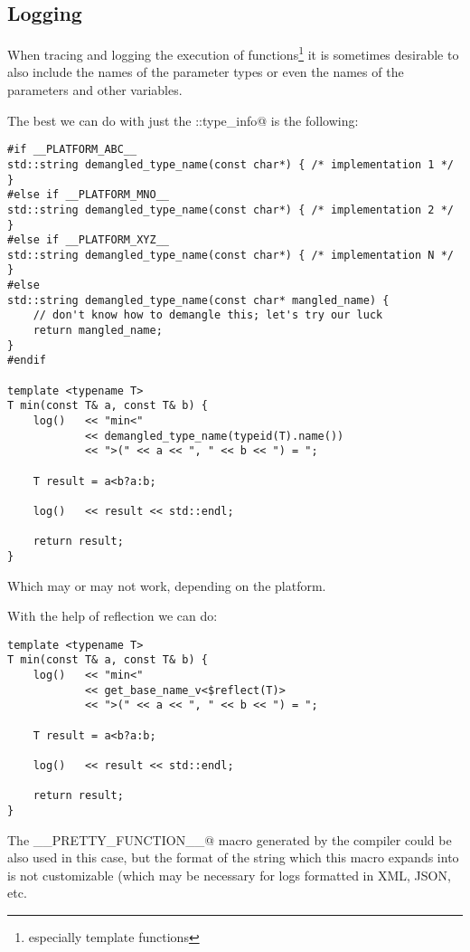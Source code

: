 \subsection{Logging}

When tracing and logging the execution of functions\footnote{especially template
functions} it is sometimes desirable to also include the names of the parameter
types or even the names of the parameters and other variables.

The best we can do with just the \verb@std::type_info@ is the following:

\begin{verbatim}
#if __PLATFORM_ABC__
std::string demangled_type_name(const char*) { /* implementation 1 */ }
#else if __PLATFORM_MNO__
std::string demangled_type_name(const char*) { /* implementation 2 */ }
#else if __PLATFORM_XYZ__
std::string demangled_type_name(const char*) { /* implementation N */ }
#else
std::string demangled_type_name(const char* mangled_name) {
	// don't know how to demangle this; let's try our luck
	return mangled_name;
}
#endif

template <typename T>
T min(const T& a, const T& b) {
	log()   << "min<"
	        << demangled_type_name(typeid(T).name())
	        << ">(" << a << ", " << b << ") = ";

	T result = a<b?a:b;

	log()   << result << std::endl;

	return result;
}

\end{verbatim}

Which may or may not work, depending on the platform.

With the help of reflection we can do:

\begin{verbatim}
template <typename T>
T min(const T& a, const T& b) {
	log()   << "min<"
	        << get_base_name_v<$reflect(T)>
	        << ">(" << a << ", " << b << ") = ";

	T result = a<b?a:b;

	log()   << result << std::endl;

	return result;
}
\end{verbatim}

The \verb@__PRETTY_FUNCTION__@ macro generated by the compiler could be also
used in this case, but the format of the string which this macro expands into
is not customizable (which may be necessary for logs formatted in XML, JSON, etc.

